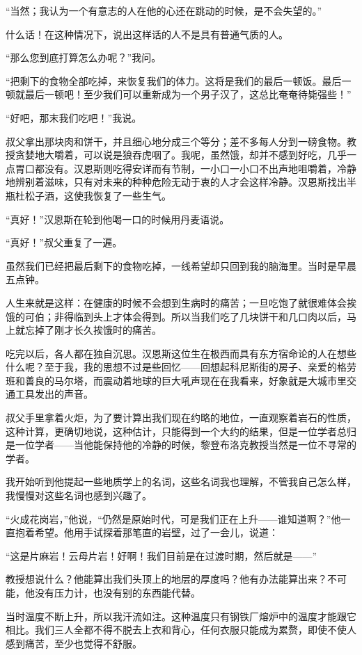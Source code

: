 \documentclass[10pt]{book}
\begin{document}
“当然；我认为一个有意志的人在他的心还在跳动的时候，是不会失望的。”

什么话！在这种情况下，说出这样话的人不是具有普通气质的人。

“那么您到底打算怎么办呢？”我问。

“把剩下的食物全部吃掉，来恢复我们的体力。这将是我们的最后一顿饭。最后一顿就最后一顿吧！至少我们可以重新成为一个男子汉了，这总比奄奄待毙强些！”

“好吧，那末我们吃吧！”我说。

叔父拿出那块肉和饼干，并且细心地分成三个等分；差不多每人分到一磅食物。教授贪婪地大嚼着，可以说是狼吞虎咽了。我呢，虽然饿，却并不感到好吃，几乎一点胃口都没有。汉恩斯则吃得安详而有节制，一小口一小口不出声地咀嚼着，冷静地辨别着滋味，只有对未来的种种危险无动于衷的人才会这样冷静。汉恩斯找出半瓶杜松子酒，这使我恢复了一些生气。

“真好！”汉恩斯在轮到他喝一口的时候用丹麦语说。

“真好！”叔父重复了一遍。

虽然我们已经把最后剩下的食物吃掉，一线希望却只回到我的脑海里。当时是早晨五点钟。

人生来就是这样：在健康的时候不会想到生病时的痛苦；一旦吃饱了就很难体会挨饿的可伯；非得临到头上才体会得到。所以当我们吃了几块饼干和几口肉以后，马上就忘掉了刚才长久挨饿时的痛苦。

吃完以后，各人都在独自沉思。汉恩斯这位生在极西而具有东方宿命论的人在想些什么呢？至于我，我的思想不过是些回忆——回想起科尼斯街的房子、亲爱的格劳班和善良的马尔塔，而震动着地球的巨大吼声现在在我看来，好象就是大城市里交通工具发出的声音。

叔父手里拿着火炬，为了要计算出我们现在约略的地位，一直观察着岩石的性质，这种计算，更确切地说，这种估计，只能得到一个大约的结果，但是一位学者总归是一位学者——当他能保持他的冷静的时候，黎登布洛克教授当然是一位不寻常的学者。

我开始听到他提起一些地质学上的名词，这些名词我也理解，不管我自己怎么样，我慢慢对这些名词也感到兴趣了。

“火成花岗岩，”他说，“仍然是原始时代，可是我们正在上升——谁知道啊？”他一直抱着希望。他用手试探着那笔直的岩壁，过了一会儿，说道：

“这是片麻岩！云母片岩！好啊！我们目前是在过渡时期，然后就是——”

教授想说什么？他能算出我们头顶上的地层的厚度吗？他有办法能算出来？不可能，他没有压力计，也没有别的东西能代替。

当时温度不断上升，所以我汗流如注。这种温度只有钢铁厂熔炉中的温度才能跟它相比。我们三人全都不得不脱去上衣和背心，任何衣服只能成为累赘，即使不使人感到痛苦，至少也觉得不舒服。
\end{document}
